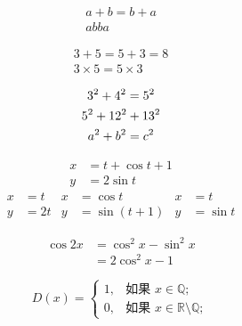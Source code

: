 \documentclass{ctexart}%
\begin{document}
	\begin{gather}
		a + b = b + a \\
		ab ba
	\end{gather}
	
	\begin{gather*}
	3+5 = 5+3 = 8 \\
	3 \times 5 = 5 \times 3
	\end{gather*}
	
	\begin{gather}
	3^2 + 4^2 = 5^2 \notag \\
	5^2 + 12^2 + 13^2 \notag \\
	a^2 + b^2 = c^2
	\end{gather}
	
	\begin{align}
		x &= t + \cos t +1 \\
		y &= 2\sin t
	\end{align}
	\begin{align*}
		x &= t & x &= \cos t & x &= t \\
		y &= 2t & y &= \sin(t+1)  & y &= \sin t
	\end{align*}
	
	\begin{equation}
		\begin{split}
		\cos 2x &= \cos^2 x - \sin^2 x \\
		&= 2\cos^2 x - 1
		\end{split}
	\end{equation}
	
	\begin{equation}
		D(x) = \begin{cases}
		1,& \text{如果 } x \in \mathbb{Q}; \\
		0,& \text{如果 } x \in \mathbb{R}\setminus\mathbb{Q};
		\end{cases}
	\end{equation}
	
\end{document}
